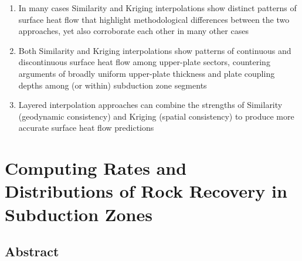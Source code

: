 \begin{enumerate}
\def\labelenumi{\arabic{enumi}.}
\tightlist
\item
  In many cases Similarity and Kriging interpolations show distinct patterns of surface heat flow that highlight methodological differences between the two approaches, yet also corroborate each other in many other cases
\item
  Both Similarity and Kriging interpolations show patterns of continuous and discontinuous surface heat flow among upper-plate sectors, countering arguments of broadly uniform upper-plate thickness and plate coupling depths among (or within) subduction zone segments
\item
  Layered interpolation approaches can combine the strengths of Similarity (geodynamic consistency) and Kriging (spatial consistency) to produce more accurate surface heat flow predictions
\end{enumerate}

\cleardoublepage

\hypertarget{chpt4}{%
\chapter{Computing Rates and Distributions of Rock Recovery in Subduction Zones}\label{chpt4}}


\hypertarget{chpt4Abstract}{%
\section{Abstract}\label{chpt4Abstract}}

